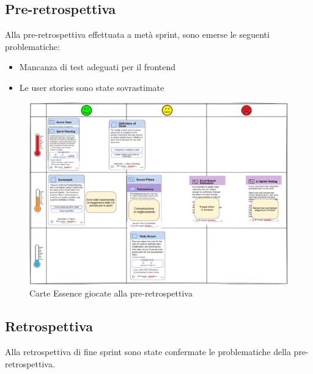 \documentclass[11pt]{article}
\begin{document}
\subsection*{Pre-retrospettiva}
Alla pre-retrospettiva effettuata a metà sprint, sono emerse le seguenti problematiche:
\begin{itemize}
    \item Mancanza di test adeguati per il frontend
    \item Le user stories sono state sovrastimate
\end{itemize}
\begin{figure}[H]
    \centering
    \includegraphics[width=12cm]{./img/preretrospettiva.png}
    \caption{Carte Essence giocate alla pre-retrospettiva}
\end{figure}

\subsection*{Retrospettiva}
Alla retrospettiva di fine sprint sono state confermate le problematiche della pre-retrospettiva.
\end{document}
